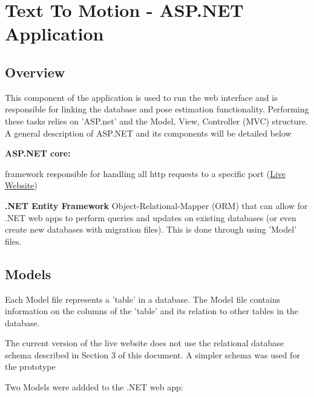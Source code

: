 \documentclass{scrreprt}
\begin{document}
\section{Text To Motion - ASP.NET Application}

\subsection{Overview}

This component of the application is used to run the web interface and is
responsible for linking the database and pose estimation functionality.
Performing these tasks relies on 'ASP.net' and the Model, View, Controller
(MVC) structure. A general description of ASP.NET and its components will be
detailed below

\textbf{ASP.NET core:}

framework responsible for handling all http requests to a specific port (\href{https://brendanduke.ca}{Live Website})

\textbf{.NET Entity Framework}
Object-Relational-Mapper (ORM) that can allow for .NET web apps to perform
queries and updates on existing databases (or even create new databases with
migration files). This is done through using 'Model' files.

\subsection{Models}

Each Model file represents a 'table' in a database. The Model file contains
information on the columns of the 'table' and its relation to other tables in
the database.

The current version of the live website does not use the relational database
schema described in Section 3 of this document. A simpler schema was used for
the prototype

Two Models were addded to the .NET web app:
\end{document}
